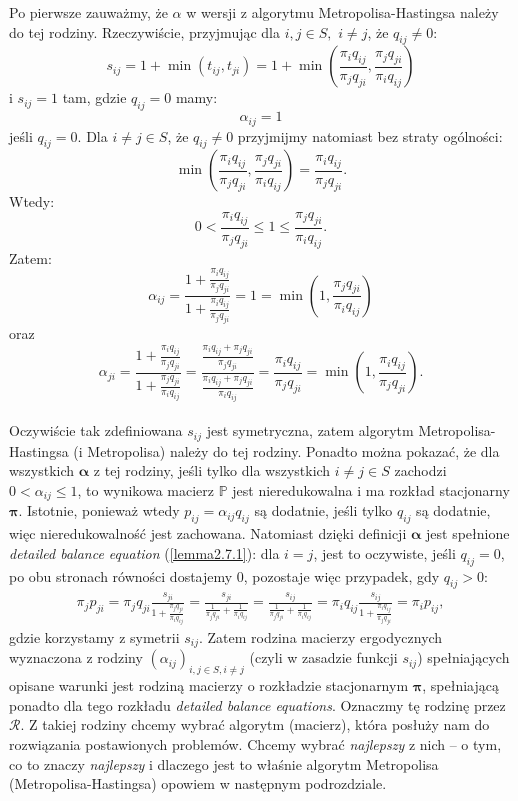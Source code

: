 \documentclass[a4paper]{article}
\theoremstyle{defn}
\theoremstyle{theorem}
\theoremstyle{lemma}
\theoremstyle{cor}
\theoremstyle{fact}
\begin{document}
Po pierwsze zauważmy, że $\alpha$ w wersji z algorytmu Metropolisa-Hastingsa należy do tej rodziny. Rzeczywiście, przyjmując dla $i,j \in S,\,\, i \neq j$, że $q_{ij} \neq 0$:
$$s_{ij} = 1 + \min(t_{ij}, t_{ji}) = 1 + \min\left(\frac{\pi_i q_{ij}}{\pi_j q_{ji}}, \frac{\pi_j q_{ji}}{\pi_i q_{ij}}\right)$$
i $s_{ij} = 1$ tam, gdzie $q_{ij} = 0$
mamy:
$$\alpha_{ij} = 1$$
jeśli $q_{ij} = 0$. Dla $i \neq j \in S$, że $q_{ij} \neq 0$ przyjmijmy natomiast bez straty ogólności:
$$\min\left(\frac{\pi_i q_{ij}}{\pi_j q_{ji}}, \frac{\pi_j q_{ji}}{\pi_i q_{ij}}\right) = \frac{\pi_i q_{ij}}{\pi_j q_{ji}}.$$
Wtedy:
$$0 < \frac{\pi_i q_{ij}}{\pi_j q_{ji}} \leq 1 \leq \frac{\pi_j q_{ji}}{\pi_i q_{ij}}.$$
Zatem:
$$\alpha_{ij} = \frac{1 + \frac{\pi_i q_{ij}}{\pi_j q_{ji}}}{1 + \frac{\pi_i q_{ij}}{\pi_j q_{ji}}} = 1 = \min(1, \frac{\pi_j q_{ji}}{\pi_i q_{ij}})$$
oraz
$$\alpha_{ji} = \frac{1 + \frac{\pi_i q_{ij}}{\pi_j q_{ji}}}{1 + \frac{\pi_j q_{ji}}{\pi_i q_{ij}}} = \frac{\frac{\pi_i q_{ij} + \pi_j q_{ji}}{\pi_j q_{ji}}}{\frac{\pi_i q_{ij} + \pi_j q_{ji}}{\pi_i q_{ij}}} = \frac{\pi_i q_{ij}}{\pi_j q_{ji}} = \min(1, \frac{\pi_i q_{ij}}{\pi_j q_{ji}}).$$
\\
Oczywiście tak zdefiniowana $s_{ij}$ jest symetryczna, zatem algorytm Metropolisa-Hastingsa (i Metropolisa) należy do tej rodziny. Ponadto można pokazać, że dla wszystkich $\boldsymbol{\alpha}$ z tej rodziny, jeśli tylko dla wszystkich $i \neq j \in S$ zachodzi $0 < \alpha_{ij} \leq 1$, to wynikowa macierz $\mathbb{P}$ jest nieredukowalna i ma rozkład stacjonarny $\boldsymbol{\pi}$. Istotnie, ponieważ wtedy $p_{ij} = \alpha_{ij}q_{ij}$ są dodatnie, jeśli tylko $q_{ij}$ są dodatnie, więc nieredukowalność jest zachowana. Natomiast dzięki definicji $\boldsymbol{\alpha}$ jest spełnione \textit{detailed balance equation} (\ref{lemma2.7.1}): dla $i = j$, jest to oczywiste, jeśli $q_{ij} = 0$, po obu stronach równości dostajemy $0$, pozostaje więc przypadek, gdy $q_{ij} > 0$:
\begin{align*}
\pi_j p_{ji} = \pi_j q_{ji} \frac{s_{ji}}{1 + \frac{\pi_j q_{ji}}{\pi_i q_{ij}}} = \frac{s_{ji}}{\frac{1}{\pi_j q_{ji}} + \frac{1}{\pi_i q_{ij}}} = \frac{s_{ij}}{\frac{1}{\pi_j q_{ji}} + \frac{1}{\pi_i q_{ij}}} = \pi_i q_{ij} \frac{s_{ij}}{1 + \frac{\pi_i q_{ij}}{\pi_j q_{ji}}} = \pi_i p_{ij},
\end{align*}
gdzie korzystamy z symetrii $s_{ij}$. Zatem rodzina macierzy ergodycznych wyznaczona z rodziny $(\alpha_{ij})_{i,j \in S, i \neq j}$ (czyli w zasadzie funkcji $s_{ij}$) spełniających opisane warunki jest rodziną macierzy o rozkładzie stacjonarnym $\boldsymbol{\pi}$, spełniającą ponadto dla tego rozkładu \textit{detailed balance equations}. Oznaczmy tę rodzinę przez $\mathcal{R}$.
Z takiej rodziny chcemy wybrać algorytm (macierz), która posłuży nam do rozwiązania postawionych problemów. Chcemy wybrać \textit{najlepszy} z nich – o tym, co to znaczy \textit{najlepszy} i dlaczego jest to właśnie algorytm Metropolisa (Metropolisa-Hastingsa) opowiem w następnym podrozdziale.
\end{document}
